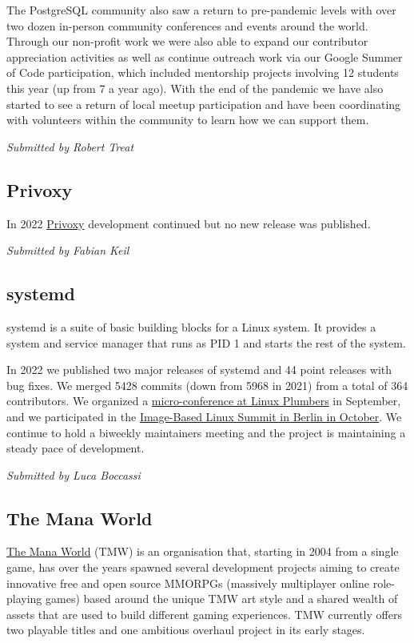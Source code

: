 \documentclass[a4paper]{report}
\begin{document}
The PostgreSQL community also saw a return to pre-pandemic levels with over two dozen in-person community conferences and events around the world. Through our non-profit work we were also able to expand our contributor appreciation activities as well as continue outreach work via our Google Summer of Code participation, which included mentorship projects involving 12 students this year (up from 7 a year ago). With the end of the pandemic we have also started to see a return of local meetup participation and have been coordinating with volunteers within the community to learn how we can support them.

{\em Submitted by Robert Treat}

\subsection{Privoxy}

In 2022 \href{https://www.privoxy.org/}{Privoxy} development continued but no new release was published.

{\em Submitted by Fabian Keil}

\subsection{systemd}

systemd is a suite of basic building blocks for a Linux system. It provides a system and service manager that runs as PID 1 and starts the rest of the system.

In 2022 we published two major releases of systemd and 44 point releases with bug fixes. We merged 5428 commits (down from 5968 in 2021) from a total of 364 contributors. We organized a \href{https://lpc.events/event/16/sessions/146/#20220912}{micro-conference at Linux Plumbers} in September, and we participated in the \href{https://uapi-group.org/docs/minutes/2022-10-05__image-based-linux-summit/}{Image-Based Linux Summit in Berlin in October}. We continue to hold a biweekly maintainers meeting and the project is maintaining a steady pace of development.

{\em Submitted by Luca Boccassi}

\subsection{The Mana World}

\href{https://www.themanaworld.org/about}{The Mana World} (TMW) is an organisation that, starting in 2004 from a single game, has over the years spawned several development projects aiming to create innovative free and open source MMORPGs (massively multiplayer online role-playing games) based around the unique TMW art style and a shared wealth of assets that are used to build different gaming experiences. TMW currently offers two playable titles and one ambitious overhaul project in its early stages.
\end{document}
